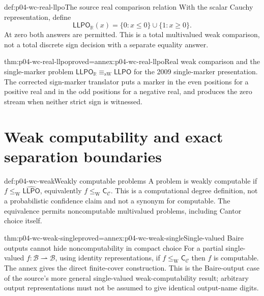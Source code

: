 \begin{hbdefinition}{def:p04-wc-real-llpo}{The source real comparison relation}
With the scalar Cauchy representation, define
\[
 \mathsf{LLPO}_{\mathbb R}(x)
 =\{0:x\leq0\}\cup\{1:x\geq0\}.
\]
At zero both answers are permitted. This is a total multivalued
weak comparison, not a total discrete sign decision with a separate
equality answer.
\end{hbdefinition}

\begin{hbtheorem}{thm:p04-wc-real-llpo}{proved=annex:p04-wc-real-llpo}{Real weak comparison and the single-marker problem}
\(\mathsf{LLPO}_{\mathbb R}\equiv_{\mathrm{sW}}\mathsf{LLPO}\)
for the 2009 single-marker presentation.
The corrected sign-marker translator puts a marker in the even
positions for a positive real and in the odd positions for a negative
real, and produces the zero stream when neither strict sign is witnessed.
\end{hbtheorem}

\section{Weak computability and exact separation boundaries}
\label{sec:p04-wc-boundaries}

\begin{hbdefinition}{def:p04-wc-weak}{Weakly computable problems}
A problem is weakly computable if
\(f\leq_{\mathrm W}\widehat{\mathsf{LLPO}}\), equivalently
\(f\leq_{\mathrm W} \mathsf{C}_{\mathcal C}\). This is a computational degree
definition, not a probabilistic confidence claim and not a synonym
for computable. The equivalence permits noncomputable multivalued
problems, including Cantor choice itself.
\end{hbdefinition}

\begin{hbtheorem}{thm:p04-wc-weak-single}{proved=annex:p04-wc-weak-single}{Single-valued Baire outputs cannot hide noncomputability in compact choice}
For a partial single-valued \(f:\mathcal B\rightharpoonup\mathcal B\),
using identity representations, if \(f\leq_{\mathrm W} \mathsf{C}_{\mathcal C}\)
then \(f\) is computable. The annex gives the direct finite-cover
construction. This is the Baire-output case of the source's more general
single-valued weak-computability result; arbitrary output representations
must not be assumed to give identical output-name digits.
\end{hbtheorem}

